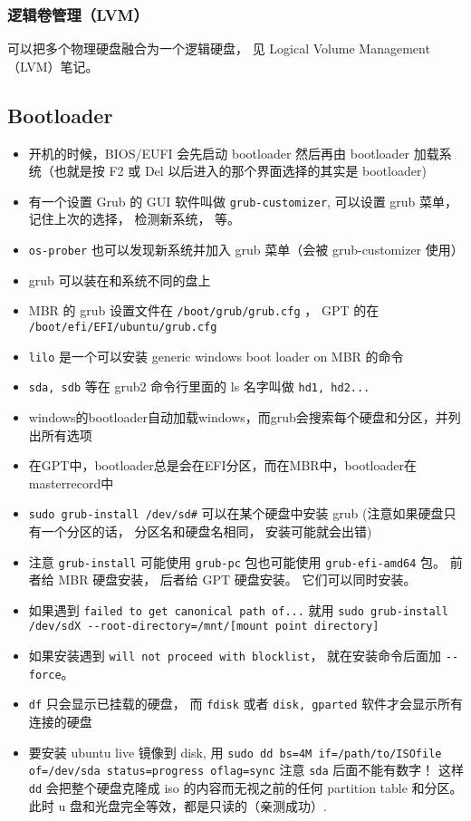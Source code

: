 \subsubsection{逻辑卷管理（LVM）}
可以把多个物理硬盘融合为一个逻辑硬盘， 见 Logical Volume Management（LVM）笔记。

\subsection{Bootloader}
\begin{itemize}
\item 开机的时候，BIOS/EUFI 会先启动 bootloader 然后再由 bootloader 加载系统（也就是按 F2 或 Del 以后进入的那个界面选择的其实是 bootloader)
\item 有一个设置 Grub 的 GUI 软件叫做 \verb|grub-customizer|, 可以设置 grub 菜单， 记住上次的选择， 检测新系统， 等。
\item \verb|os-prober| 也可以发现新系统并加入 grub 菜单（会被 grub-customizer 使用）
\item grub 可以装在和系统不同的盘上
\item MBR 的 grub 设置文件在 \verb|/boot/grub/grub.cfg| ， GPT 的在 \verb|/boot/efi/EFI/ubuntu/grub.cfg|
\item \verb|lilo| 是一个可以安装 generic windows boot loader on MBR 的命令
\item \verb|sda, sdb| 等在 grub2 命令行里面的 ls 名字叫做 \verb|hd1, hd2...|
\item windows的bootloader自动加载windows，而grub会搜索每个硬盘和分区，并列出所有选项
\item 在GPT中，bootloader总是会在EFI分区，而在MBR中，bootloader在masterrecord中
\item \verb|sudo grub-install /dev/sd#| 可以在某个硬盘中安装 grub (注意如果硬盘只有一个分区的话， 分区名和硬盘名相同， 安装可能就会出错)
\item 注意 \verb|grub-install| 可能使用 \verb|grub-pc| 包也可能使用 \verb|grub-efi-amd64| 包。 前者给 MBR 硬盘安装， 后者给 GPT 硬盘安装。 它们可以同时安装。
\item 如果遇到 \verb|failed to get canonical path of...| 就用 \verb|sudo grub-install /dev/sdX --root-directory=/mnt/[mount point directory]|
\item 如果安装遇到 \verb|will not proceed with blocklist|， 就在安装命令后面加 \verb|--force|。
\item \verb|df| 只会显示已挂载的硬盘， 而 \verb|fdisk| 或者 \verb|disk, gparted| 软件才会显示所有连接的硬盘
\item 要安装 ubuntu live 镜像到 disk, 用 \verb|sudo dd bs=4M if=/path/to/ISOfile of=/dev/sda status=progress oflag=sync| 注意 \verb|sda| 后面不能有数字！ 这样 \verb|dd| 会把整个硬盘克隆成 iso 的内容而无视之前的任何 partition table 和分区。 此时 u 盘和光盘完全等效，都是只读的（亲测成功）.
\end{itemize}

